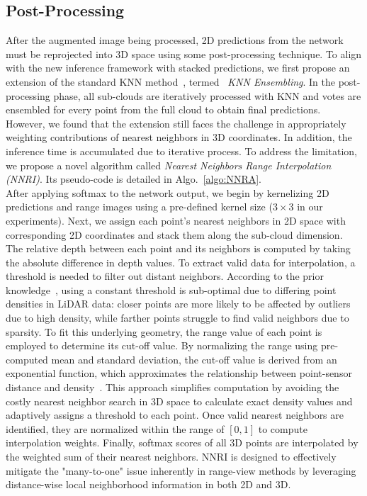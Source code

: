 \subsection{Post-Processing}
\label{sec:post-processing}
After the augmented image being processed, 2D predictions from the network must be reprojected into 3D space using some post-processing technique. To align with the new inference framework with stacked predictions, we first propose an extension of the standard KNN method~\cite{2019rangenet++}, termed ~\textit{KNN Ensembling}. In the post-processing phase, all sub-clouds are iteratively processed with KNN and votes are ensembled for every point from the full cloud to obtain final predictions. However, we found that the extension still faces the challenge in appropriately weighting contributions of nearest neighbors in 3D coordinates. In addition, the inference time is accumulated due to iterative process. To address the limitation, we propose a novel algorithm called \textit{Nearest Neighbors Range Interpolation (NNRI)}. Its pseudo-code is detailed in Algo.~\ref{algo:NNRA}. \\
After applying softmax to the network output, we begin by kernelizing 2D predictions and range images using a pre-defined kernel size ($3\times3$ in our experiments). Next, we assign each point's nearest neighbors in 2D space with corresponding 2D coordinates and stack them along the sub-cloud dimension. The relative depth between each point and its neighbors is computed by taking the absolute difference in depth values. To extract valid data for interpolation, a threshold is needed to filter out distant neighbors. According to the prior knowledge~\cite{hu2022pointdensity, lawin2018densityregistation}, using a constant threshold is sub-optimal due to differing point densities in LiDAR data: closer points are more likely to be affected by outliers due to high density, while farther points struggle to find valid neighbors due to sparsity. To fit this underlying geometry, the range value of each point is employed to determine its cut-off value. By normalizing the range using pre-computed mean and standard deviation, the cut-off value is derived from an exponential function, which approximates the relationship between point-sensor distance and density~\cite{liu2024extend}. This approach simplifies computation by avoiding the costly nearest neighbor search in 3D space to calculate exact density values and adaptively assigns a threshold to each point. Once valid nearest neighbors are identified, they are normalized within the range of $[0, 1]$ to compute interpolation weights. Finally, softmax scores of all 3D points are interpolated by the weighted sum of their nearest neighbors. NNRI is designed to effectively mitigate the "many-to-one" issue inherently in range-view methods by leveraging distance-wise local neighborhood information in both 2D and 3D.
